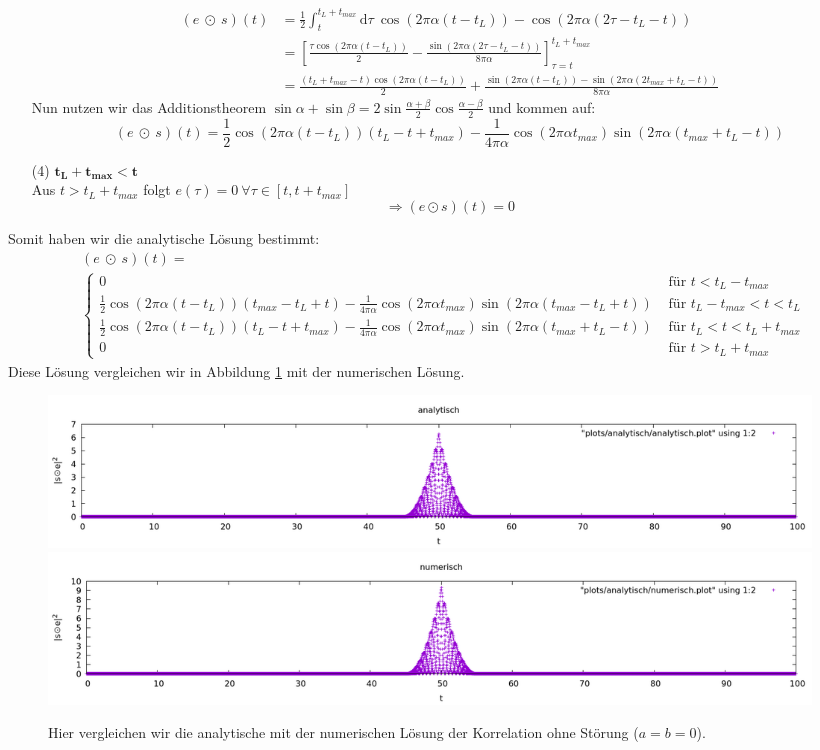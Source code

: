 \documentclass[ngerman]{scrartcl}
\begin{document}
\begin{itemize}
	\begin{align*}
		(e ~\odot~ s)(t)&=\frac{1}{2}\int_{t}^{t_L+t_{max}} \mathrm{d} \tau~ \cos(2\pi\alpha(t-t_L))-\cos(2\pi\alpha(2\tau-t_L-t))\\
		&=\left[\frac{\tau\cos(2\pi\alpha(t-t_L))}{2}-\frac{\sin(2\pi\alpha(2\tau-t_L-t))}{8\pi\alpha}\right]_{\tau=t}^{t_L+t_{max}}\\
		&=\frac{(t_L+t_{max}-t)\cos(2\pi\alpha(t-t_L))}{2}+\frac{\sin(2\pi\alpha(t-t_L))-\sin(2\pi\alpha(2t_{max}+t_L-t))}{8\pi\alpha}
	\end{align*}
	Nun nutzen wir das Additionstheorem $\sin \alpha +\sin \beta = 2 \sin \frac{\alpha + \beta}{2} \cos \frac{\alpha - \beta}{2}$ und kommen auf:
	\begin{equation*}
		(e ~\odot~ s)(t)=\frac{1}{2}\cos(2\pi\alpha(t-t_L))(t_L-t+t_{max})-\frac{1}{4\pi\alpha}\cos(2\pi\alpha t_{max})\sin(2\pi\alpha(t_{max}+t_L-t))
	\end{equation*}
	\item [(4)] {$\mathbf{t_L+t_{max}<t}$}\\
	Aus $t>t_L+t_{max}$ folgt $e(\tau)=0~\forall\tau\in[t,t+t_{max}]$
	\begin{equation*}
		\Rightarrow(e \odot s)(t)=0
	\end{equation*}
\end{itemize}
Somit haben wir die analytische L\"osung bestimmt:
\begin{align*}
	&(e ~\odot~ s)(t)=\\
	&\left\{\begin{array}{ll}
	0 & \text { für } t<t_L-t_{max}\\
	\frac{1}{2}\cos(2\pi\alpha(t-t_L))(t_{max}-t_L+t)-\frac{1}{4\pi\alpha}\cos(2\pi\alpha t_{max})\sin(2\pi\alpha(t_{max}-t_L+t))
	& \text { für } t_L-t_{max}<t<t_L\\
	\frac{1}{2}\cos(2\pi\alpha(t-t_L))(t_L-t+t_{max})-\frac{1}{4\pi\alpha}\cos(2\pi\alpha t_{max})\sin(2\pi\alpha(t_{max}+t_L-t))
	& \text { für } t_L<t<t_L+t_{max}\\
	0 & \text { für } t>t_L+t_{max}
	\end{array}\right.
\end{align*}
Diese Lösung vergleichen wir in Abbildung \ref{fig:4.1} mit der numerischen L\"osung.
\begin{figure}[htbp]
	\centering
	\includegraphics[width=0.98\textwidth]{plots/analytisch/analytisch.png}
	\includegraphics[width=0.98\textwidth]{plots/analytisch/numerisch.png}
	\caption[Vergleich]{Hier vergleichen wir die analytische mit der numerischen Lösung der Korrelation ohne Störung ($a=b=0$).}
	\label{fig:4.1}
\end{figure} 
\end{document}
